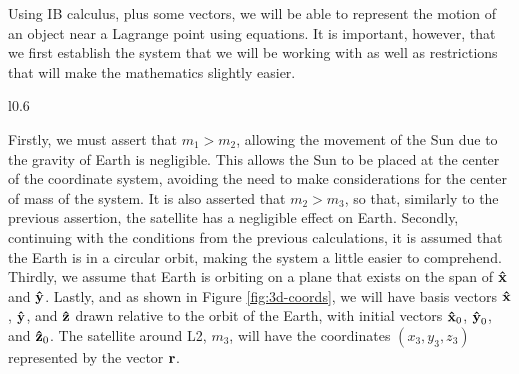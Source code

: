 Using IB calculus, plus some vectors, we will be able to represent the motion of an object near a Lagrange point using equations.
It is important, however, that we first establish the system that we will be working with as well as restrictions that will make the mathematics slightly easier.
\begin{wrapfigure}{l}{0.6\textwidth}
	\centering
	\vspace*{0.25cm}
	\caption{three-dimensional diagram of the Sun-Earth system with unit vectors relative to the Earth's orbit. Not drawn to scale.}
	\label{fig:3d-coords}
\end{wrapfigure}
Firstly, we must assert that $m_1 > m_2$, allowing the movement of the Sun due to the gravity of Earth is negligible.
This allows the Sun to be placed at the center of the coordinate system, avoiding the need to make considerations for the center of mass of the system.
It is also asserted that $m_2 > m_3$, so that, similarly to the previous assertion, the satellite has a negligible effect on Earth.
Secondly, continuing with the conditions from the previous calculations, it is assumed that the Earth is in a circular orbit, making the system a little easier to comprehend.
Thirdly, we assume that Earth is orbiting on a plane that exists on the span of $\uvec{x}$ and $\uvec{y}$.
Lastly, and as shown in Figure \ref{fig:3d-coords}, we will have basis vectors $\uvec{x}$, $\uvec{y}$, and $\uvec{z}$ drawn relative to the orbit of the Earth, with initial vectors $\uvec{x}_0$, $\uvec{y}_0$, and $\uvec{z}_0$.
The satellite around L2, $m_3$, will have the coordinates $(x_3,y_3,z_3)$ represented by the vector $\bm{\mathbf{r}}$.

